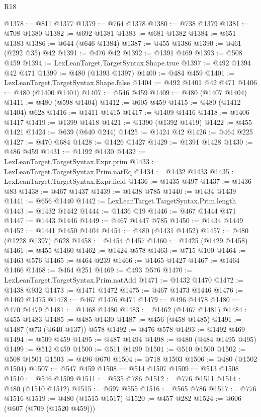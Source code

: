 \begin{lexlean}{R18}
\begin{coremodule}
{{{{{{{{{{{{{{{{{{{{{{{{{{{{{{{{{{{{{{{{{{{{{{{{{{{{{{{{{{{{{{{{{{{{{{{{{{{{{{{{{{{{{{{{{{{{{{{{{{{{{{{{{{{{{@1378 := @811 @1377
@1379 := @764 @1378
@1380 := @738 @1379
@1381 := @708 @1380
@1382 := @692 @1381
@1383 := @681 @1382
@1384 := @651 @1383
@1386 := @644 (@646 @1384)
@1387 := @455 @1386
@1390 := @461 (@292 @35) @42
@1391 := @476 @42
@1392 := @1391 @469
@1393 := @508 @459
@1394 := LexLeanTarget.TargetSyntax.Shape.true
@1397 := @492 @1394 @42 @471
@1399 := @480 (@1393 @1397)
@1400 := @484 @459
@1401 := LexLeanTarget.TargetSyntax.Shape.false
@1404 := @492 @1401 @42 @471
@1406 := @480 (@1400 @1404)
@1407 := @546 @459
@1409 := @480 (@1407 @1404)
@1411 := @480 (@598 @1404)
@1412 := @605 @459
@1415 := @480 (@1412 @1404) @628
@1416 := @1411 @1415
@1417 := @1409 @1416
@1418 := @1406 @1417
@1419 := @1399 @1418
@1421 := @1390 (@1392 @1419)
@1422 := @455 @1421
@1424 := @639 (@640 @244)
@1425 := @1424 @42
@1426 := @464 @225
@1427 := @470 @684
@1428 := @1426 @1427
@1429 := @1391 @1428
@1430 := @486 @459
@1431 := @1192 @1430
@1432 := LexLeanTarget.TargetSyntax.Expr.prim
@1433 := LexLeanTarget.TargetSyntax.Prim.natEq
@1434 := @1432 @1433
@1435 := LexLeanTarget.TargetSyntax.Expr.field
@1436 := @1435 @497
@1437 := @1436 @83
@1438 := @467 @1437
@1439 := @1438 @785
@1440 := @1434 @1439
@1441 := @656 @1440
@1442 := LexLeanTarget.TargetSyntax.Prim.length
@1443 := @1432 @1442
@1444 := @1436 @19
@1446 := @467 @1444 @471
@1447 := @1443 @1446
@1449 := @467 @1447 @785
@1450 := @1434 @1449
@1452 := @1441 @1450 @1404
@1454 := @480 (@1431 @1452)
@1457 := @480 (@1228 @1397) @628
@1458 := @1454 @1457
@1460 := @1425 (@1429 @1458)
@1461 := @455 @1460
@1462 := @1424 @578
@1463 := @715 @100
@1464 := @1463 @576
@1465 := @464 @239
@1466 := @1465 @1427
@1467 := @1464 @1466
@1468 := @464 @251
@1469 := @493 @576
@1470 := LexLeanTarget.TargetSyntax.Prim.natAdd
@1471 := @1432 @1470
@1472 := @1438 @932
@1473 := @1471 @1472
@1475 := @467 @1473 @1446
@1476 := @1469 @1475
@1478 := @467 @1476 @471
@1479 := @496 @1478
@1480 := @470 @1479
@1481 := @1468 @1480
@1483 := @1462 (@1467 @1481)
@1484 := @455 @1483
@1485 := @485 @1430
@1487 := @456 (@458 @1485)
@1491 := @1487 (@73 (@640 @137)) @578
@1492 := @476 @578
@1493 := @1492 @469
@1494 := @509 @459
@1495 := @487 @1494
@1498 := @480 (@484 @1495 @495)
@1499 := @512 @459
@1500 := @511 @1499
@1501 := @510 @1500
@1502 := @508 @1501
@1503 := @496 @670
@1504 := @718 @1503
@1506 := @480 (@1502 @1504)
@1507 := @547 @459
@1508 := @514 @1507
@1509 := @513 @1508
@1510 := @546 @1509
@1511 := @535 @786
@1512 := @776 @1511
@1514 := @480 (@1510 @1512)
@1515 := @597 @555
@1516 := @565 @786
@1517 := @776 @1516
@1519 := @480 (@1515 @1517)
@1520 := @457 @282
@1524 := @606 (@607 (@709 (@1520 @459)))
}}}}}}}}}}}}}}}}}}}}}}}}}}}}}}}}}}}}}}}}}}}}}}}}}}}}}}}}}}}}}}}}}}}}}}}}}}}}}}}}}}}}}}}}}}}}}}}}}}}}}}}}}}}}}
\end{coremodule}
\end{lexlean}
